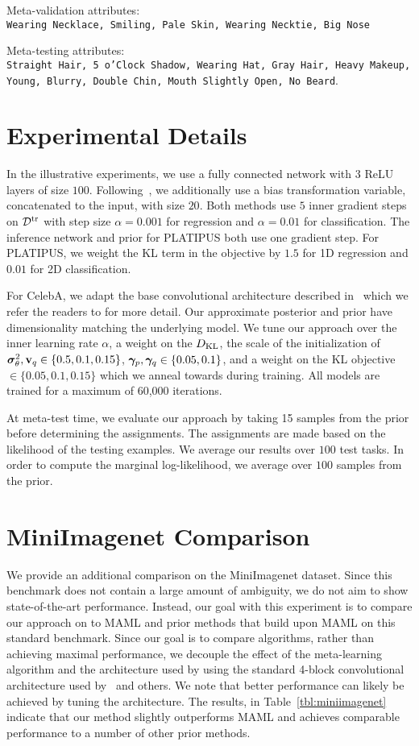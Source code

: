 \documentclass{article}
\begin{document}
Meta-validation attributes:\\
{\small \texttt{Wearing Necklace, Smiling, Pale Skin, Wearing Necktie, Big Nose}}

Meta-testing attributes:\\
{ \small \texttt{Straight Hair, 5 o'Clock Shadow, Wearing Hat, Gray Hair, Heavy Makeup, Young, Blurry, Double Chin, Mouth Slightly Open, No Beard}}.

\section{Experimental Details}
In the illustrative experiments, we use a fully connected network with 3 ReLU layers of size $100$. Following~\citet{finn2017one}, we additionally use a bias transformation variable, concatenated to the input, with size $20$. Both methods use $5$ inner gradient steps on $\mathcal{D}^\text{tr}$ with step size $\alpha=0.001$ for regression and $\alpha=0.01$ for classification. The inference network and prior for PLATIPUS both use one gradient step. For PLATIPUS, we weight the KL term in the objective by $1.5$ for 1D regression and $0.01$ for 2D classification.

For CelebA, we adapt the base convolutional architecture described in~\citet{finn2017model} which we refer the readers to for more detail. Our approximate posterior and prior have dimensionality matching the underlying model.
We tune our approach over the inner learning rate $\alpha$, a weight on the $D_\text{KL}$, the scale of the initialization of $\bm{\sigma}_\theta^2, \mathbf{v}_q \in \{0.5, 0.1, 0.15\}$, $\bm{\gamma}_p, \bm{\gamma}_q \in \{0.05, 0.1\}$, and a weight on the KL objective $\in \{0.05, 0.1, 0.15\}$ which we anneal towards during training. All models are trained for a maximum of 60,000 iterations.

At meta-test time, we evaluate our approach by taking 15 samples from the prior before determining the assignments. The assignments are made based on the likelihood of the testing examples. We average our results over $100$ test tasks. In order to compute the marginal log-likelihood, we average over $100$ samples from the prior. 

\section{MiniImagenet Comparison}

We provide an additional comparison on the MiniImagenet dataset.
Since this benchmark does not contain a large amount of ambiguity, we do not aim to show state-of-the-art performance. Instead, our goal with this experiment is to compare our approach on to MAML and prior methods that build upon MAML on this standard benchmark. Since our goal is to compare algorithms, rather than achieving maximal performance, we decouple the effect of the meta-learning algorithm and the architecture used by using the standard 4-block convolutional architecture used by~\citet{vinyals2016matching,ravi2017optimization,finn2017model} and others. We note that better performance can likely be achieved by tuning the architecture. The results, in Table~\ref{tbl:miniimagenet} indicate that our method slightly outperforms MAML and achieves comparable performance to a number of other prior methods.
\end{document}
